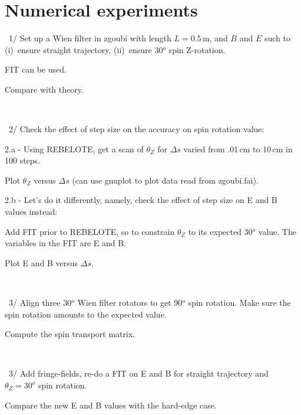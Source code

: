\documentclass[10pt]{article}
\newcommand{\nin}{\noindent~}
\begin{document}
\section*{ Numerical experiments }


\nin 1/ Set up a Wien filter in zgoubi with length  $ L=0.5$\,m, and $ B$ and $E$ such to (i)~ensure straight trajectory,
(ii)~ensure 30$^o$  spin Z-rotation.

FIT can be used. 

Compare with theory.

~

\nin 2/  Check the effect of step size on the accuracy on spin rotation value: 

\medskip

2.a - Using REBELOTE, get a scan of $ \theta_Z $  for $ \Delta s$ varied from  .01\,cm to 10\,cm in 100 steps. 

Plot  $\theta_Z$ versus $ \Delta s $  (can use gnuplot to plot data read from zgoubi.fai).

\medskip

2.b - Let's do it differently, namely, check the effect of step size on E and B values instead:

 Add FIT prior to REBELOTE, so to constrain  $ \theta_Z $ to its expected 30$^o$ value.
The variables in the FIT are  E and B.

Plot  E and B versus $ \Delta s $. 


~

\nin 3/ Align three 30$^o$  Wien filter rotators to get 90$^o$  spin rotation.  Make sure the spin rotation amounts to the expected value.

Compute the spin transport matrix.


~

   \nin 3/ 
   Add fringe-fields, re-do a FIT on E and B for straight trajectory and $\theta_Z = 30^o$ spin rotation.

   Compare the new E and B values with the hard-edge case. 
\end{document}
